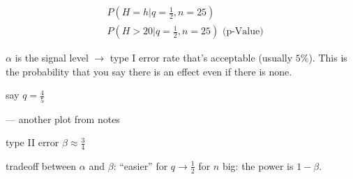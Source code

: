 \begin{align*}
&P\left(H=h |q=\frac{1}{2},n=25\right) \\
&P\left(H>20 |q=\frac{1}{2},n=25\right) \mbox{ (p-Value)}
\end{align*}

$\alpha$ is the signal level $\rightarrow$ type I error rate that's acceptable (usually $5\%$). This is the probability that you say there is an effect even if there is none.

say $q = \frac{4}{5}$

--- another plot from notes

type II error $\beta \approx \frac{3}{4}$

tradeoff between $\alpha$ and $\beta$: ``easier'' for $q \rightarrow \frac{1}{2}$ for $n$ big: the power is $1-\beta$.